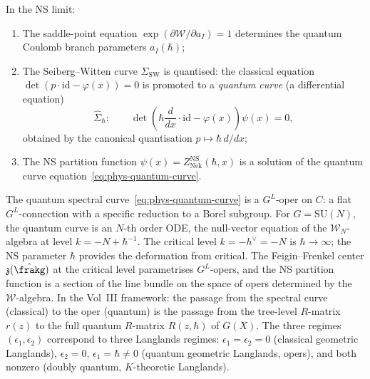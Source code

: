 \begin{theorem}
\label{thm:phys-ns-quantization}
In the NS limit:
\begin{enumerate}[label=(\roman*)]
\item The saddle-point equation $\exp(\partial\mathcal{W}/\partial a_I) = 1$
 determines the quantum Coulomb branch parameters $a_I(\hbar)$;
\item The Seiberg--Witten curve $\Sigma_{\mathrm{SW}}$ is quantised: the
 classical equation $\det(p\cdot\mathrm{id} - \varphi(x)) = 0$ is promoted
 to a \emph{quantum curve} (a differential equation)
 \begin{equation}\label{eq:phys-quantum-curve}
 \widehat{\Sigma}_\hbar\colon\qquad
 \det\!\left(\hbar\frac{d}{dx}\cdot\mathrm{id} - \varphi(x)\right)\psi(x) = 0,
 \end{equation}
 obtained by the canonical quantisation $p \mapsto \hbar\,d/dx$;
\item The NS partition function $\psi(x) = Z_{\mathrm{Nek}}^{\mathrm{NS}}(\hbar, x)$
 is a solution of the quantum curve equation~\eqref{eq:phys-quantum-curve}.
\end{enumerate}
\end{theorem}

\begin{remark}
\label{rem:phys-quantum-curve-oper}
The quantum spectral curve~\eqref{eq:phys-quantum-curve} is a $G^L$-oper on
$C$: a flat $G^L$-connection with a specific reduction to a Borel subgroup.
For $G = \mathrm{SU}(N)$, the quantum curve is an $N$-th order ODE, the
null-vector equation of the $\mathcal{W}_N$-algebra at level
$k = -N + \hbar^{-1}$. The critical level $k = -h^\vee = -N$ is
$\hbar \to \infty$; the NS parameter $\hbar$ provides the deformation from
critical. The Feigin--Frenkel center $\mathfrak{z}(\hat{\frakg})$ at the critical
level parametrises $G^L$-opers, and the NS partition function is a section of
the line bundle on the space of opers determined by the $\mathcal{W}$-algebra.
In the Vol~III framework: the passage from the spectral curve (classical) to
the oper (quantum) is the passage from the tree-level $R$-matrix $r(z)$ to
the full quantum $R$-matrix $R(z, \hbar)$ of $G(X)$. The three regimes
$(\epsilon_1, \epsilon_2)$ correspond to three Langlands regimes:
$\epsilon_1 = \epsilon_2 = 0$ (classical geometric Langlands),
$\epsilon_2 = 0$, $\epsilon_1 = \hbar \neq 0$ (quantum geometric Langlands,
opers), and both nonzero (doubly quantum, $K$-theoretic Langlands).
\end{remark}

